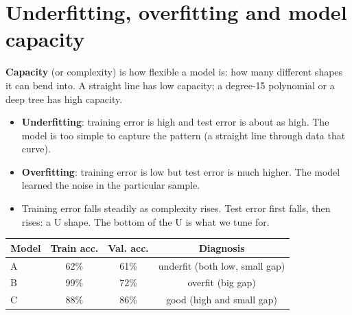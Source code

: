 \section{Underfitting, overfitting and model capacity}

\textbf{Capacity} (or complexity) is how flexible a model is: how many different shapes it can bend into.
A straight line has low capacity; a degree-15 polynomial or a deep tree has high capacity.

\begin{center}
\end{center}

\begin{itemize}
\item \textbf{Underfitting}: training error is high and test error is about as high. The model is too
  simple to capture the pattern (a straight line through data that curve).
\item \textbf{Overfitting}: training error is low but test error is much higher. The model learned the
  noise in the particular sample.
\item Training error falls steadily as complexity rises. Test error first falls, then rises: a U shape.
  The bottom of the U is what we tune for.
\end{itemize}

\begin{example}
\begin{tabular}{lccc}
Model & Train acc. & Val. acc. & Diagnosis\\\hline
A & 62\% & 61\% & underfit (both low, small gap)\\
B & 99\% & 72\% & overfit (big gap)\\
C & 88\% & 86\% & good (high and small gap)\\
\end{tabular}
\end{example}

